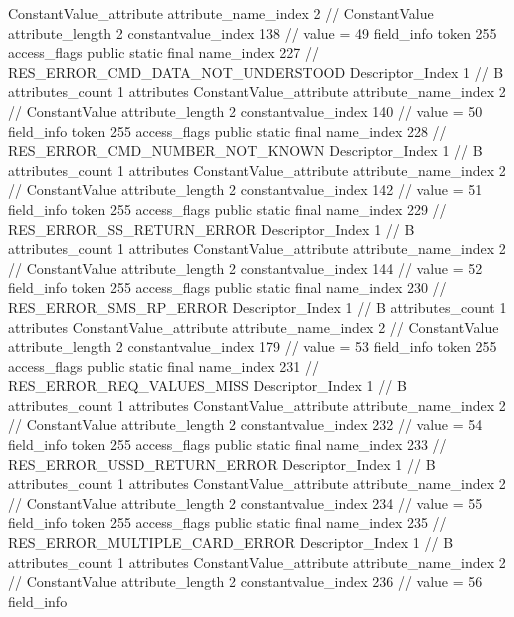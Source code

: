 {{{{{{				ConstantValue_attribute {
					attribute_name_index	2		// ConstantValue
					attribute_length	2
					constantvalue_index	138		// value = 49
				}
				}
			}
			field_info {
				token	255
				access_flags	public static final
				name_index	227		// RES_ERROR_CMD_DATA_NOT_UNDERSTOOD
				Descriptor_Index	1		// B
				attributes_count	1
				attributes {
				ConstantValue_attribute {
					attribute_name_index	2		// ConstantValue
					attribute_length	2
					constantvalue_index	140		// value = 50
				}
				}
			}
			field_info {
				token	255
				access_flags	public static final
				name_index	228		// RES_ERROR_CMD_NUMBER_NOT_KNOWN
				Descriptor_Index	1		// B
				attributes_count	1
				attributes {
				ConstantValue_attribute {
					attribute_name_index	2		// ConstantValue
					attribute_length	2
					constantvalue_index	142		// value = 51
				}
				}
			}
			field_info {
				token	255
				access_flags	public static final
				name_index	229		// RES_ERROR_SS_RETURN_ERROR
				Descriptor_Index	1		// B
				attributes_count	1
				attributes {
				ConstantValue_attribute {
					attribute_name_index	2		// ConstantValue
					attribute_length	2
					constantvalue_index	144		// value = 52
				}
				}
			}
			field_info {
				token	255
				access_flags	public static final
				name_index	230		// RES_ERROR_SMS_RP_ERROR
				Descriptor_Index	1		// B
				attributes_count	1
				attributes {
				ConstantValue_attribute {
					attribute_name_index	2		// ConstantValue
					attribute_length	2
					constantvalue_index	179		// value = 53
				}
				}
			}
			field_info {
				token	255
				access_flags	public static final
				name_index	231		// RES_ERROR_REQ_VALUES_MISS
				Descriptor_Index	1		// B
				attributes_count	1
				attributes {
				ConstantValue_attribute {
					attribute_name_index	2		// ConstantValue
					attribute_length	2
					constantvalue_index	232		// value = 54
				}
				}
			}
			field_info {
				token	255
				access_flags	public static final
				name_index	233		// RES_ERROR_USSD_RETURN_ERROR
				Descriptor_Index	1		// B
				attributes_count	1
				attributes {
				ConstantValue_attribute {
					attribute_name_index	2		// ConstantValue
					attribute_length	2
					constantvalue_index	234		// value = 55
				}
				}
			}
			field_info {
				token	255
				access_flags	public static final
				name_index	235		// RES_ERROR_MULTIPLE_CARD_ERROR
				Descriptor_Index	1		// B
				attributes_count	1
				attributes {
				ConstantValue_attribute {
					attribute_name_index	2		// ConstantValue
					attribute_length	2
					constantvalue_index	236		// value = 56
				}
				}
			}
			field_info {
}}}}}
